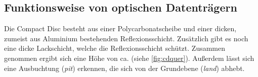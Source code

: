 \subsection{Funktionsweise von optischen Datenträgern}
\label{subsec:cdfunktionsweise}

Die Compact Disc besteht aus einer Polycarbonatscheibe und einer
 dicken, zumeist aus Aluminium bestehenden
Reflexionsschicht. Zusätzlich gibt es noch eine  dicke
Lackschicht, welche die Reflexionsschicht schützt. Zusammen genommen ergibt sich
eine Höhe von ca.  (siehe \autoref{fig:cdquer}). Außerdem
lässt sich eine Ausbuchtung (\textit{pit}) erkennen, die sich von der Grundebene
(\textit{land}) abhebt.


